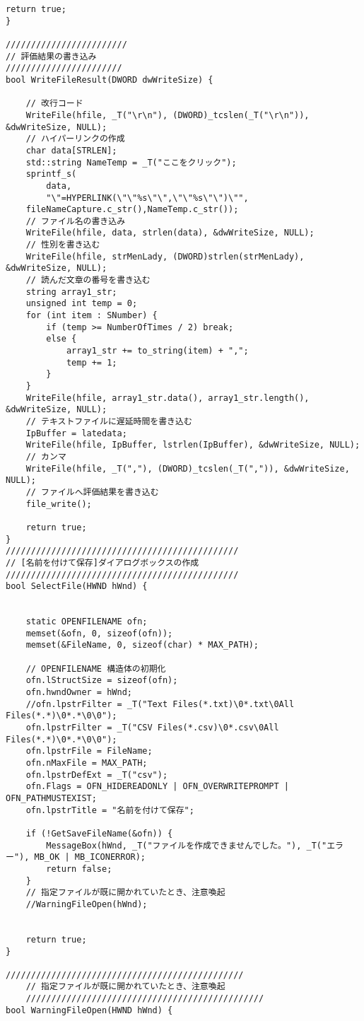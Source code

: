 \begin{lstlisting}[caption=file.cpp]
	return true;
}

////////////////////////
// 評価結果の書き込み
///////////////////////
bool WriteFileResult(DWORD dwWriteSize) {

	// 改行コード
	WriteFile(hfile, _T("\r\n"), (DWORD)_tcslen(_T("\r\n")), &dwWriteSize, NULL);
	// ハイパーリンクの作成
	char data[STRLEN];
	std::string NameTemp = _T("ここをクリック");
	sprintf_s(
		data,
		"\"=HYPERLINK(\"\"%s\"\",\"\"%s\"\")\"",
	fileNameCapture.c_str(),NameTemp.c_str());
	// ファイル名の書き込み
	WriteFile(hfile, data, strlen(data), &dwWriteSize, NULL);
	// 性別を書き込む
	WriteFile(hfile, strMenLady, (DWORD)strlen(strMenLady), &dwWriteSize, NULL);
	// 読んだ文章の番号を書き込む 
	string array1_str;
	unsigned int temp = 0;
	for (int item : SNumber) {
		if (temp >= NumberOfTimes / 2) break;
		else {
			array1_str += to_string(item) + ",";
			temp += 1;
		}
	}
	WriteFile(hfile, array1_str.data(), array1_str.length(), &dwWriteSize, NULL);
	// テキストファイルに遅延時間を書き込む
	IpBuffer = latedata;
	WriteFile(hfile, IpBuffer, lstrlen(IpBuffer), &dwWriteSize, NULL);
	// カンマ
	WriteFile(hfile, _T(","), (DWORD)_tcslen(_T(",")), &dwWriteSize, NULL);
	// ファイルへ評価結果を書き込む
	file_write();

	return true;
}
//////////////////////////////////////////////
// [名前を付けて保存]ダイアログボックスの作成
//////////////////////////////////////////////
bool SelectFile(HWND hWnd) {


	static OPENFILENAME ofn;
	memset(&ofn, 0, sizeof(ofn));
	memset(&FileName, 0, sizeof(char) * MAX_PATH);

	// OPENFILENAME 構造体の初期化
	ofn.lStructSize = sizeof(ofn);
	ofn.hwndOwner = hWnd;
	//ofn.lpstrFilter = _T("Text Files(*.txt)\0*.txt\0All Files(*.*)\0*.*\0\0"); 
	ofn.lpstrFilter = _T("CSV Files(*.csv)\0*.csv\0All Files(*.*)\0*.*\0\0");
	ofn.lpstrFile = FileName;
	ofn.nMaxFile = MAX_PATH;
	ofn.lpstrDefExt = _T("csv");
	ofn.Flags = OFN_HIDEREADONLY | OFN_OVERWRITEPROMPT | OFN_PATHMUSTEXIST; 
	ofn.lpstrTitle = "名前を付けて保存";

	if (!GetSaveFileName(&ofn)) {
		MessageBox(hWnd, _T("ファイルを作成できませんでした。"), _T("エラー"), MB_OK | MB_ICONERROR);
		return false;
	}
	// 指定ファイルが既に開かれていたとき、注意喚起
	//WarningFileOpen(hWnd);
	
	
	return true;
}

///////////////////////////////////////////////
	// 指定ファイルが既に開かれていたとき、注意喚起 
	///////////////////////////////////////////////
bool WarningFileOpen(HWND hWnd) {


\end{lstlisting}
